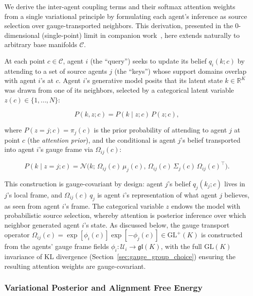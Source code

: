 \documentclass[11pt]{article}
\begin{document}
We derive the inter-agent coupling terms and their softmax attention weights from a single variational principle by formulating each agent's inference as source selection over gauge-transported neighbors. This derivation, presented in the 0-dimensional (single-point) limit in companion work~\cite{Dennis2026GL}, here extends naturally to arbitrary base manifolds $\mathcal{C}$.

At each point $c \in \mathcal{C}$, agent $i$ (the ``query'') seeks to update its belief $q_i(k; c)$ by attending to a set of source agents $j$ (the ``keys'') whose support domains overlap with agent $i$'s at $c$. Agent $i$'s generative model posits that its latent state $k \in \mathbb{R}^{K}$ was drawn from one of its neighbors, selected by a categorical latent variable $z(c) \in \{1, \ldots, N\}$:

\begin{equation}
P(k, z; c) = P(k \mid z; c) \, P(z; c),
\label{eq:mixture_joint}
\end{equation}

where $P(z{=}j; c) = \pi_j(c)$ is the prior probability of attending to agent $j$ at point $c$ (the \emph{attention prior}), and the conditional is agent $j$'s belief transported into agent $i$'s gauge frame via $\Omega_{ij}(c)$:

\begin{equation}
P(k \mid z{=}j; c) = \mathcal{N}\!\big(k;\, \Omega_{ij}(c)\,\mu_j(c),\, \Omega_{ij}(c)\,\Sigma_j(c)\,\Omega_{ij}(c)^\top\big).
\end{equation}

This construction is gauge-covariant by design: agent $j$'s belief $q_j(k_j; c)$ lives in $j$'s local frame, and $\Omega_{ij}(c)\,q_j$ is agent $i$'s representation of what agent $j$ believes, as seen from agent $i$'s frame. The categorical variable $z$ endows the model with probabilistic source selection, whereby attention is posterior inference over which neighbor generated agent $i$'s state. As discussed below, the gauge transport operator $\Omega_{ij}(c) = \exp[\phi_i(c)]\exp[-\phi_j(c)] \in \mathrm{GL}^+(K)$ is constructed from the agents' gauge frame fields $\phi_i: \mathcal{U}_i \to \mathfrak{gl}(K)$, with the full $\mathrm{GL}(K)$ invariance of KL divergence (Section~\ref{sec:gauge_group_choice}) ensuring the resulting attention weights are gauge-covariant.

\subsubsection{Variational Posterior and Alignment Free Energy}
\end{document}
